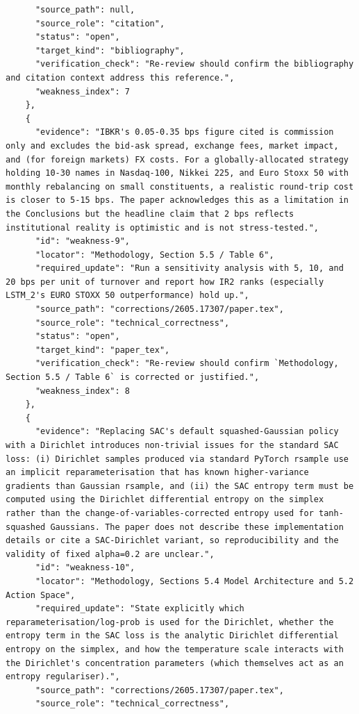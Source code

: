 \documentclass[11pt]{article}
\begin{document}
\begin{verbatim}
      "source_path": null,
      "source_role": "citation",
      "status": "open",
      "target_kind": "bibliography",
      "verification_check": "Re-review should confirm the bibliography and citation context address this reference.",
      "weakness_index": 7
    },
    {
      "evidence": "IBKR's 0.05-0.35 bps figure cited is commission only and excludes the bid-ask spread, exchange fees, market impact, and (for foreign markets) FX costs. For a globally-allocated strategy holding 10-30 names in Nasdaq-100, Nikkei 225, and Euro Stoxx 50 with monthly rebalancing on small constituents, a realistic round-trip cost is closer to 5-15 bps. The paper acknowledges this as a limitation in the Conclusions but the headline claim that 2 bps reflects institutional reality is optimistic and is not stress-tested.",
      "id": "weakness-9",
      "locator": "Methodology, Section 5.5 / Table 6",
      "required_update": "Run a sensitivity analysis with 5, 10, and 20 bps per unit of turnover and report how IR2 ranks (especially LSTM_2's EURO STOXX 50 outperformance) hold up.",
      "source_path": "corrections/2605.17307/paper.tex",
      "source_role": "technical_correctness",
      "status": "open",
      "target_kind": "paper_tex",
      "verification_check": "Re-review should confirm `Methodology, Section 5.5 / Table 6` is corrected or justified.",
      "weakness_index": 8
    },
    {
      "evidence": "Replacing SAC's default squashed-Gaussian policy with a Dirichlet introduces non-trivial issues for the standard SAC loss: (i) Dirichlet samples produced via standard PyTorch rsample use an implicit reparameterisation that has known higher-variance gradients than Gaussian rsample, and (ii) the SAC entropy term must be computed using the Dirichlet differential entropy on the simplex rather than the change-of-variables-corrected entropy used for tanh-squashed Gaussians. The paper does not describe these implementation details or cite a SAC-Dirichlet variant, so reproducibility and the validity of fixed alpha=0.2 are unclear.",
      "id": "weakness-10",
      "locator": "Methodology, Sections 5.4 Model Architecture and 5.2 Action Space",
      "required_update": "State explicitly which reparameterisation/log-prob is used for the Dirichlet, whether the entropy term in the SAC loss is the analytic Dirichlet differential entropy on the simplex, and how the temperature scale interacts with the Dirichlet's concentration parameters (which themselves act as an entropy regulariser).",
      "source_path": "corrections/2605.17307/paper.tex",
      "source_role": "technical_correctness",

\end{verbatim}
\end{document}
